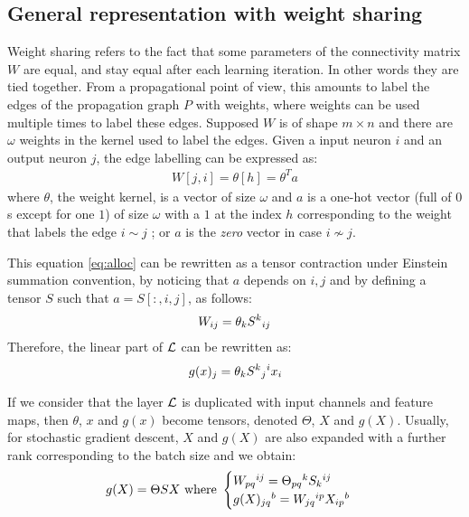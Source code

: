 \subsection{General representation with weight sharing}
\label{sec:nct}

Weight sharing refers to the fact that some parameters of the connectivity matrix $W$ are equal, and stay equal after each learning iteration. In other words they are tied together. From a propagational point of view, this amounts to label the edges of the propagation graph $P$ with weights, where weights can be used multiple times to label these edges. Supposed $W$ is of shape $m \times n$ and there are $\omega$ weights in the kernel used to label the edges. Given a input neuron $i$ and an output neuron $j$, the edge labelling can be expressed as:
\begin{gather}
W[j,i] = \theta[h] = \theta^T a \label{eq:alloc}
\end{gather}
where $\theta$, the weight kernel, is a vector of size $\omega$ and $a$ is a one-hot vector (full of $0$s except for one $1$) of size $\omega$ with a $1$ at the index $h$ corresponding to the weight that labels the edge $i \sim j$ ; or $a$ is the \emph{zero} vector in case $i \nsim j$.

This equation \eqref{eq:alloc} can be rewritten as a tensor contraction under Einstein summation convention, by noticing that $a$ depends on $i,j$ and by defining a tensor $S$ such that $a = S[:,i,j]$, as follows:
\begin{gather}
W_{ij} = \theta_k S^k \h{0}_{ij}
\end{gather}
Therefore, the linear part of $\cl$ can be rewritten as:
\begin{gather}
g(x)_j = \theta_k S^k \h{0}_j \h{0}^i x_i
\end{gather}

If we consider that the layer $\cl$ is duplicated with input channels and feature maps, then $\theta$, $x$ and $g(x)$ become tensors, denoted $\Theta$, $X$ and $g(X)$. Usually, for stochastic gradient descent, $X$ and $g(X)$ are also expanded with a further rank corresponding to the batch size and we obtain:
\begin{gather}
g(X) = \Theta S X
\text{ where } \begin{cases} W_{pq}\h{0}^{ij} = \Theta_{pq}\h{0}^k S_k\h{0}^{ij} \\ g(X)_{jq}\h{0}^b = W_{jq}\h{0}^{ip} X_{ip}\h{0}^{b} \end{cases} \label{eq:ternary}
\end{gather}

